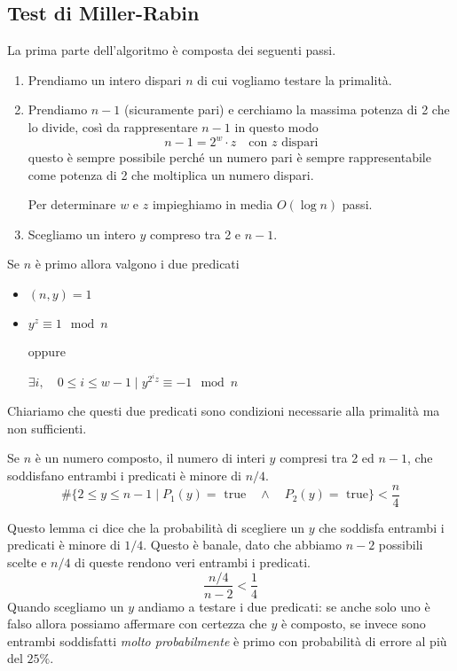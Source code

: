 \subsection{Test di Miller-Rabin}\label{Miller_Rabin}
La prima parte dell'algoritmo \`e composta dei seguenti passi.
\begin{enumerate}
	\item Prendiamo un intero dispari $n$ di cui vogliamo testare la primalit\`a.
	\item Prendiamo $n-1$ (sicuramente pari) e cerchiamo la massima potenza di 2 che lo divide, cos\`i da rappresentare
	      $n-1$ in questo modo
	      \[ n-1 = 2^w \cdot z \quad \text{con $z$ dispari} \]
	      questo \`e sempre possibile perch\'e un numero pari \`e sempre rappresentabile come potenza di 2 che
	      moltiplica un numero dispari.

	      Per determinare $w$ e $z$ impieghiamo in media $O(\log n)$ passi.
	\item Scegliamo un intero $y$ compreso tra 2 e $n-1$.
\end{enumerate}
Se $n$ \`e primo allora valgono i due predicati
\begin{itemize}
	\item $(n, y) = 1$
	\item $y^z \equiv 1 \mod{n}$

	      oppure

	      $\exists i, \quad 0 \leq i \leq w-1 \mid y^{2^i z} \equiv -1 \mod{n}$
\end{itemize}
Chiariamo che questi due predicati sono condizioni necessarie alla primalit\`a ma non sufficienti.

\begin{lemma}
	Se $n$ \`e un numero composto, il numero di interi $y$ compresi tra 2 ed $n-1$, che soddisfano entrambi i predicati
	\`e minore di $n / 4$.
	\[ \# \{ 2 \leq y \leq n-1 \mid P_1(y) = \text{ true} \quad \wedge \quad P_2(y) = \text{ true} \} < \frac{n}{4} \]
\end{lemma}
Questo lemma ci dice che la probabilit\`a di scegliere un $y$ che soddisfa entrambi i predicati \`e minore di $1 / 4$.
Questo \`e banale, dato che abbiamo $n - 2$ possibili scelte e $n / 4$ di queste rendono veri entrambi i predicati.
\[ \frac{n/4}{n-2} < \frac{1}{4} \]
Quando scegliamo un $y$ andiamo a testare i due predicati: se anche solo uno \`e falso allora possiamo affermare con
certezza che $y$ \`e composto, se invece sono entrambi soddisfatti \emph{molto probabilmente} \`e primo con
probabilit\`a di errore al pi\`u del $25\%$.

